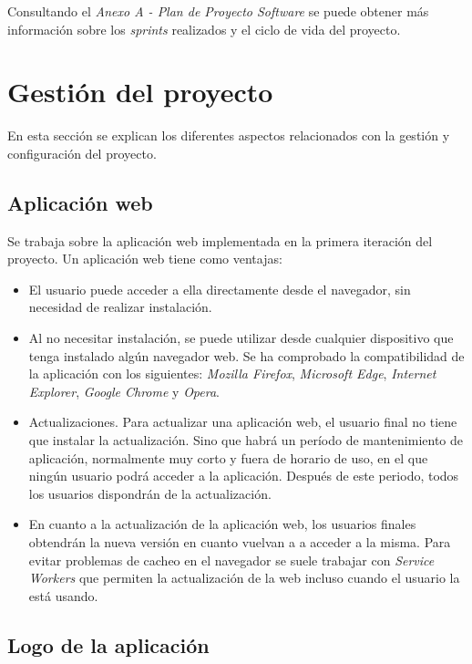 Consultando el \textit{Anexo A - Plan de Proyecto Software} se puede obtener más información sobre los \textit{sprints} realizados y el ciclo de vida del proyecto.

\section{Gestión del proyecto}

En esta sección se explican los diferentes aspectos relacionados con la gestión y configuración del proyecto.

\subsection{Aplicación web}

Se trabaja sobre la aplicación web implementada en la primera iteración del proyecto\cite{TFGPrevio}.
Un aplicación web tiene como ventajas: 
\begin{itemize}
	\tightlist
	\item El usuario puede acceder a ella directamente desde el navegador, sin necesidad de realizar instalación.
	\item  Al no necesitar instalación, se puede utilizar desde cualquier dispositivo que tenga instalado algún navegador web. Se ha comprobado la compatibilidad de la aplicación con los siguientes: \textit{Mozilla Firefox}, \textit{Microsoft Edge}, \textit{Internet Explorer}, \textit{Google Chrome} y \textit{Opera}.
	\item Actualizaciones. Para actualizar una aplicación web, el usuario final no tiene que instalar la actualización. Sino que habrá un período de mantenimiento de aplicación, normalmente muy corto y fuera de horario de uso, en el que ningún usuario podrá acceder a la aplicación. Después de este periodo, todos los usuarios dispondrán de la actualización.
	\item En cuanto a la actualización de la aplicación web, los usuarios finales obtendrán la nueva versión en cuanto vuelvan a a acceder a la misma. Para evitar problemas de cacheo en el navegador se suele trabajar con \textit{Service Workers} que permiten la actualización de la web incluso cuando el usuario la está usando.
\end{itemize}


\subsection{Logo de la aplicación}


